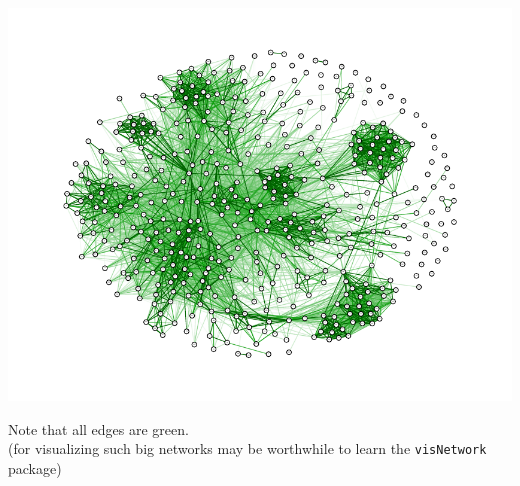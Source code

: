 \documentclass[11pt,handout,aspectratio=169,dvipsnames]{beamer}
\begin{document}
\begin{frame}{}
\begin{center}
	\includegraphics[scale=.8]{pics/huge_stocks2}	
\end{center}
Note that all edges are green.\\
{\scriptsize (for visualizing such big networks may be worthwhile to learn the \texttt{visNetwork} package)}
\end{frame}
\end{document}

